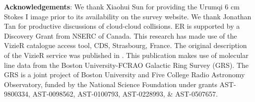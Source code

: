  
% 
% 

\textbf{Acknowledgements}:
We thank Xiaohui Sun for providing the Urumqi 6 cm Stokes I image prior to its
availability on the survey website.  We thank Jonathan Tan for productive
discussions of cloud-cloud collisions.
ER is supported by a Discovery Grant from NSERC of Canada.
This research has made use of the VizieR catalogue access tool, CDS,
Strasbourg, France. The original description of the VizieR service was
published in \citep{Ochsenbein2000a}.
This publication makes use of molecular line data from the Boston
University-FCRAO Galactic Ring Survey (GRS). The GRS is a joint project of
Boston University and Five College Radio Astronomy Observatory, funded by the
National Science Foundation under grants AST-9800334, AST-0098562, AST-0100793,
AST-0228993, \& AST-0507657.

